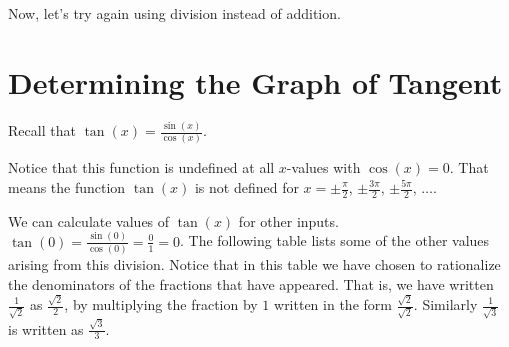 \documentclass{ximera}
\begin{document}
	Now, let's try again using division instead of addition.

\section{Determining the Graph of Tangent}	
	Recall that $\tan(x)=\frac{\sin(x)}{\cos(x)}$.
	
	Notice that this function is undefined at all $x$-values with $\cos(x) = 0$. That means the function $\tan(x)$ is not defined for $x=\pm \frac{\pi}{2}$, 
	$\pm \frac{3\pi}{2}$, $\pm \frac{5\pi}{2}$, $\ldots$.
	
	We can calculate values of $\tan(x)$ for other inputs. $\tan\left( 0\right) = \frac{\sin\left( 0\right)}{\cos\left(0\right)} = \frac{0}{1} = 0$.
	The following table lists some of the other values arising from this division. Notice that in this table we have chosen to rationalize the denominators
	of the fractions that have appeared. That is, we have written $\frac{1}{\sqrt{2}}$ as $\frac{\sqrt{2}}{2}$, by multiplying the fraction by $1$ written in 
	the form $\frac{\sqrt{2}}{\sqrt{2}}$. Similarly $\frac{1}{\sqrt{3}}$ is written as $\frac{\sqrt{3}}{3}$. 
\end{document}
